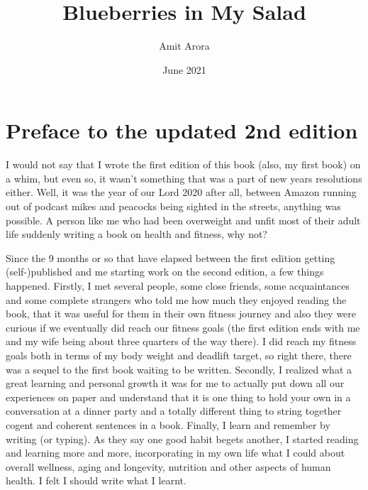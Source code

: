 \documentclass[
  oneside]{book}
\title{Blueberries in My Salad}
\author{Amit Arora}
\date{June 2021}
\begin{document}
\maketitle

{
\hypersetup{linkcolor=}
\setcounter{tocdepth}{1}
\tableofcontents
}
\hypertarget{preface-to-the-updated-2nd-edition}{%
\chapter{Preface to the updated 2nd edition}\label{preface-to-the-updated-2nd-edition}}

I would not say that I wrote the first edition of this book (also, my first book) on a whim, but even so, it wasn't something that was a part of new years resolutions either. Well, it was the year of our Lord 2020 after all, between Amazon running out of podcast mikes and peacocks being sighted in the streets, anything was possible. A person like me who had been overweight and unfit most of their adult life suddenly writing a book on health and fitness, why not?

Since the 9 months or so that have elapsed between the first edition getting (self-)published and me starting work on the second edition, a few things happened. Firstly, I met several people, some close friends, some acquaintances and some complete strangers who told me how much they enjoyed reading the book, that it was useful for them in their own fitness journey and also they were curious if we eventually did reach our fitness goals (the first edition ends with me and my wife being about three quarters of the way there). I did reach my fitness goals both in terms of my body weight and deadlift target, so right there, there was a sequel to the first book waiting to be written. Secondly, I realized what a great learning and personal growth it was for me to actually put down all our experiences on paper and understand that it is one thing to hold your own in a conversation at a dinner party and a totally different thing to string together cogent and coherent sentences in a book. Finally, I learn and remember by writing (or typing). As they say one good habit begets another, I started reading and learning more and more, incorporating in my own life what I could about overall wellness, aging and longevity, nutrition and other aspects of human health. I felt I should write what I learnt.
\end{document}
